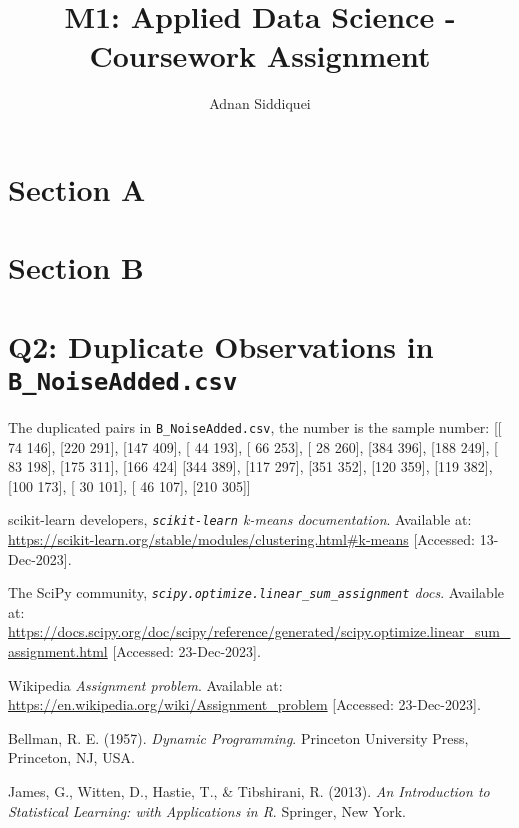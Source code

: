 \documentclass[a4paper,11pt]{article}
\title{\boldmath M1: Applied Data Science - Coursework Assignment}
\author{Adnan Siddiquei}
\affiliation{University of Cambridge}
\newcommand{\inlinecode}[1]{\lstinline{#1}}
\begin{document}
\maketitle
\flushbottom


\section{Section A}\label{sec:section-a}





\section{Section B}\label{sec:section-b}



\appendix

\section{Q2: Duplicate Observations in \inlinecode{B_NoiseAdded.csv}}\label{appendix:q2}
The duplicated pairs in \inlinecode{B_NoiseAdded.csv}, the number is the sample number:
[[ 74 146], [220 291], [147 409], [ 44 193], [ 66 253], [ 28 260], [384 396], [188 249], [ 83 198], [175 311], [166 424]
 [344 389], [117 297], [351 352], [120 359], [119 382], [100 173], [ 30 101], [ 46 107], [210 305]]


\begin{thebibliography}{99}

scikit-learn developers,
\textit{\inlinecode{scikit-learn} k-means documentation}.
Available at: \url{https://scikit-learn.org/stable/modules/clustering.html#k-means}
[Accessed: 13-Dec-2023].

The SciPy community,
\textit{\inlinecode{scipy.optimize.linear_sum_assignment} docs}.
Available at: \url{https://docs.scipy.org/doc/scipy/reference/generated/scipy.optimize.linear_sum_assignment.html}
[Accessed: 23-Dec-2023].

Wikipedia
\textit{Assignment problem}.
Available at: \url{https://en.wikipedia.org/wiki/Assignment_problem}
[Accessed: 23-Dec-2023].

Bellman, R. E. (1957).
\textit{Dynamic Programming}.
Princeton University Press, Princeton, NJ, USA.

James, G., Witten, D., Hastie, T., \& Tibshirani, R. (2013).
\textit{An Introduction to Statistical Learning: with Applications in R}.
Springer, New York.


\end{thebibliography}
\end{document}
